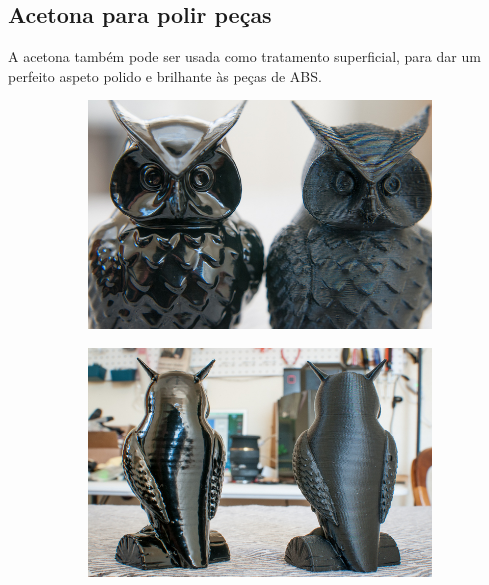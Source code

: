 \documentclass[11pt,a4paper]{article}
\begin{document}
	\subsection{Acetona para polir peças}A acetona também pode ser usada como tratamento superficial, para dar um perfeito aspeto polido e brilhante às peças de ABS. 
\begin{figure}[H]
    \centering
    \begin{subfigure}[b]{0.4\textwidth}
        \includegraphics[width=\textwidth,cfbox=azul_marcos 4pt 0pt]{FOTOS/VAPORACETONA1}
    \end{subfigure}
    \qquad %
    \begin{subfigure}[b]{0.4\textwidth}
        \includegraphics[width=\textwidth,cfbox=azul_marcos 4pt 0pt]{FOTOS/VAPORACETONA2}
    \end{subfigure}   
\end{figure}
\end{document}
